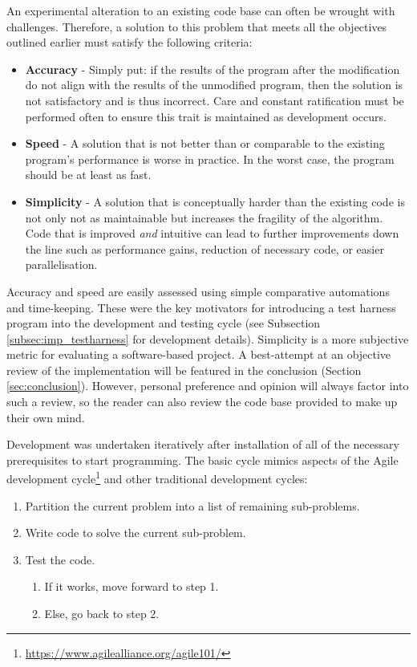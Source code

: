 \documentclass[conference]{IEEEtran}
\begin{document}
An experimental alteration to an existing code base can often be wrought with challenges. Therefore, a solution to this problem that meets all the objectives outlined earlier must satisfy the following criteria:

\begin{itemize}
    \item \textbf{Accuracy} - Simply put: if the results of the program after the modification do not align with the results of the unmodified program, then the solution is not satisfactory and is thus incorrect. Care and constant ratification must be performed often to ensure this trait is maintained as development occurs.
    \item \textbf{Speed} - A solution that is not better than or comparable to the existing program's performance is worse in practice. In the worst case, the program should be at least as fast.
    \item \textbf{Simplicity} - A solution that is conceptually harder than the existing code is not only not as maintainable but increases the fragility of the algorithm. Code that is improved \textit{and} intuitive can lead to further improvements down the line such as performance gains, reduction of necessary code, or easier parallelisation.
\end{itemize}

Accuracy and speed are easily assessed using simple comparative automations and time-keeping. These were the key motivators for introducing a test harness program into the development and testing cycle (see Subsection \ref{subsec:imp_testharness} for development details). Simplicity is a more subjective metric for evaluating a software-based project. A best-attempt at an objective review of the implementation will be featured in the conclusion (Section \ref{sec:conclusion}). However, personal preference and opinion will always factor into such a review, so the reader can also review the code base provided to make up their own mind.

Development was undertaken iteratively after installation of all of the necessary prerequisites to start programming. The basic cycle mimics aspects of the Agile development cycle\footnote{\url{https://www.agilealliance.org/agile101/}} and other traditional development cycles:

\begin{enumerate}
    \item Partition the current problem into a list of remaining sub-problems.
    \item Write code to solve the current sub-problem.
    \item Test the code.
    \begin{enumerate}
        \item If it works, move forward to step 1.
        \item Else, go back to step 2.
    \end{enumerate}
\end{enumerate}
\end{document}
